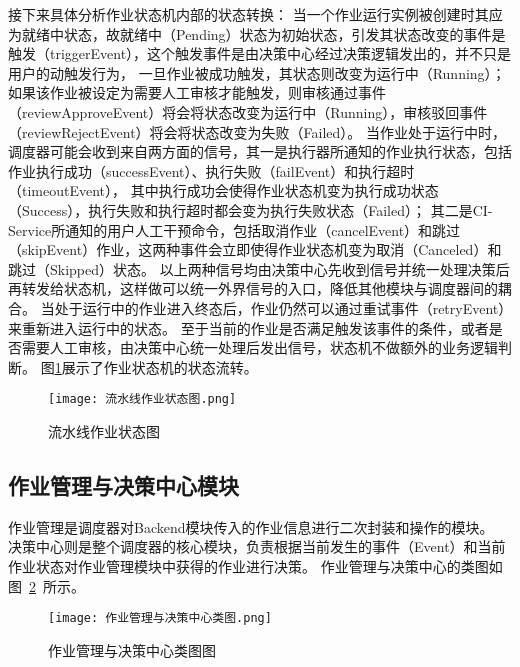 接下来具体分析作业状态机内部的状态转换：
当一个作业运行实例被创建时其应为就绪中状态，故就绪中（Pending）状态为初始状态，引发其状态改变的事件是触发（triggerEvent），这个触发事件是由决策中心经过决策逻辑发出的，并不只是用户的动触发行为，
一旦作业被成功触发，其状态则改变为运行中（Running）；如果该作业被设定为需要人工审核才能触发，则审核通过事件（reviewApproveEvent）将会将状态改变为运行中（Running），审核驳回事件（reviewRejectEvent）将会将状态改变为失败（Failed）。
当作业处于运行中时，调度器可能会收到来自两方面的信号，其一是执行器所通知的作业执行状态，包括作业执行成功（successEvent）、执行失败（failEvent）和执行超时（timeoutEvent），
其中执行成功会使得作业状态机变为执行成功状态（Success），执行失败和执行超时都会变为执行失败状态（Failed）；
其二是CI-Service所通知的用户人工干预命令，包括取消作业（cancelEvent）和跳过（skipEvent）作业，这两种事件会立即使得作业状态机变为取消（Canceled）和跳过（Skipped）状态。
以上两种信号均由决策中心先收到信号并统一处理决策后再转发给状态机，这样做可以统一外界信号的入口，降低其他模块与调度器间的耦合。
当处于运行中的作业进入终态后，作业仍然可以通过重试事件（retryEvent）来重新进入运行中的状态。
至于当前的作业是否满足触发该事件的条件，或者是否需要人工审核，由决策中心统一处理后发出信号，状态机不做额外的业务逻辑判断。
图\ref{fig:流水线作业状态图}展示了作业状态机的状态流转。

\begin{figure}[h]
  \centering
  \texttt{[image: 流水线作业状态图.png]}
  \caption{流水线作业状态图}
  \label{fig:流水线作业状态图}
\end{figure}



\subsection{作业管理与决策中心模块}

作业管理是调度器对Backend模块传入的作业信息进行二次封装和操作的模块。
决策中心则是整个调度器的核心模块，负责根据当前发生的事件（Event）和当前作业状态对作业管理模块中获得的作业进行决策。
作业管理与决策中心的类图如图~\ref{fig:作业管理与决策中心类图}~所示。

\begin{figure}[h]
  \centering
  \texttt{[image: 作业管理与决策中心类图.png]}
  \caption{作业管理与决策中心类图图}
  \label{fig:作业管理与决策中心类图}
\end{figure}

